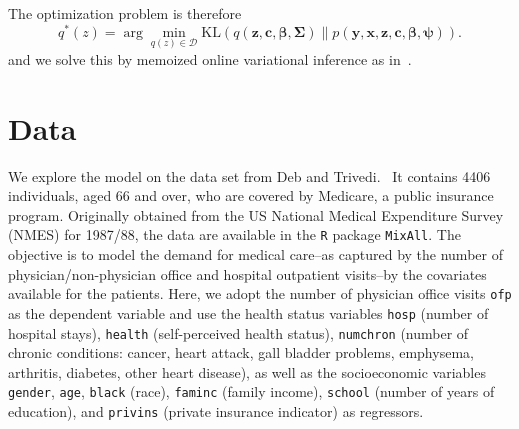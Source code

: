 \documentclass[a4paper,UKenglish]{oasics}
\begin{document}
The optimization problem is therefore
$$
q^*(z)=\arg\underset{q(z)\in \mathcal{D}} \min \mathrm{KL}(q(\mathbf{z},\mathbf{c},\boldsymbol{\beta},\boldsymbol{\Sigma})\|p(\mathbf{y},\mathbf{x},\mathbf{z},\boldsymbol{c},\boldsymbol{\beta},\boldsymbol{\psi})).
$$
and we solve this by memoized online variational inference as in~\cite{movi}.%


\section{Data}
We explore the model on the data set from Deb and Trivedi.~\cite{DebTrivedi}
It contains 4406 individuals, aged 66 and over, who are covered
by Medicare, a public insurance program. Originally obtained from the US National Medical
Expenditure Survey (NMES) for 1987/88, the data are available in the \texttt{R} package \texttt{MixAll}. 
The objective is to model the demand for medical care--as captured by the
number of physician/non-physician office and hospital outpatient visits--by the covariates
available for the patients. Here, we adopt the number of physician office visits \texttt{ofp} as the
dependent variable and use the health status variables \texttt{hosp} (number of hospital stays), \texttt{health}
(self-perceived health status), \texttt{numchron} (number of chronic conditions: cancer, heart attack, gall bladder problems, emphysema, arthritis, diabetes, other heart disease), as well as the socioeconomic
variables \texttt{gender}, \texttt{age}, \texttt{black} (race), \texttt{faminc} (family income), \texttt{school} (number of years of education), and \texttt{privins} (private insurance indicator) as regressors.
\end{document}
